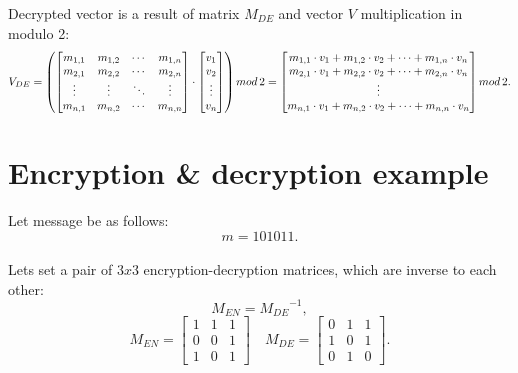 \documentclass{article}
\begin{document}
    Decrypted vector is a result of matrix $M_{DE}$ and vector $V$ multiplication in modulo 2:
    $$V_{DE}= \left(
    \begin{bmatrix}
    m_{1,1} & m_{1,2} & \cdots & m_{1,n} \\
    m_{2,1} & m_{2,2} & \cdots & m_{2,n} \\
    \vdots  & \vdots  & \ddots & \vdots  \\
    m_{n,1} & m_{n,2} & \cdots & m_{n,n} 
    \end{bmatrix}
    \cdot
    \begin{bmatrix}
    v_{1}  \\
    v_{2}  \\
    \vdots   \\
    v_{n}  
    \end{bmatrix}\right)
    mod\,2
    =
    \begin{bmatrix}
    m_{1,1} \color{black}\cdot v_1 \color{black}+ m_{1,2} \color{black}\cdot v_2 \color{black} + \color{black}\cdots \color{black}+ m_{1,n} \color{black}\cdot v_n\\
    m_{2,1} \color{black}\cdot v_1 \color{black}+ m_{2,2} \color{black}\cdot v_2 \color{black} + \color{black}\cdots \color{black}+ m_{2,n} \color{black}\cdot v_n\\
    \vdots   \\
    m_{n,1} \color{black}\cdot v_1 \color{black}+ m_{n,2} \color{black}\cdot v_2 \color{black} + \color{black}\cdots \color{black}+ m_{n,n} \color{black}\cdot v_n
    \end{bmatrix} 
    mod\,2.
    $$

\newpage
\section{Encryption \& decryption example}
    Let message be as follows: $$m = 101011.$$\\
    \indent Lets set a pair of $3x3$ encryption-decryption matrices, which are inverse to each other:
    $$M_{EN} = {M_{DE}}^{-1},$$
    \vspace{1mm}
    $$M_{EN}=\begin{bmatrix}
    1 & 1 & 1 \\
    0 & 0 & 1 \\
    1 & 0 & 1
    \end{bmatrix} \quad
    M_{DE}=\begin{bmatrix}
    0 & 1 & 1 \\
    1 & 0 & 1 \\
    0 & 1 & 0
    \end{bmatrix}.$$ \vspace{2mm}
    
\end{document}
